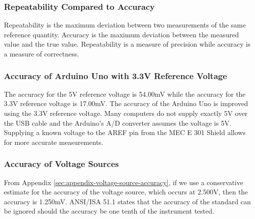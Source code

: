 \subsubsection{Repeatability Compared to Accuracy}
\noindent Repeatability is the maximum deviation between two measurements of the same reference quantity. Accuracy is the maximum deviation between the
measured value and the true value. Repeatability is a measure of precision while accuracy is a measure of correctness.

\subsubsection{Accuracy of Arduino Uno with 3.3V Reference Voltage}


\noindent The accuracy for the 5V reference voltage is 54.00mV while the accuracy for the 3.3V reference voltage is 17.00mV. The accuracy of the Arduino Uno is improved
using the 3.3V reference voltage. Many computers do not supply exactly 5V over the USB cable and the Arduino's A/D converter assumes the voltage is 5V. 
Supplying a known voltage to the AREF pin from the MEC E 301 Shield allows for more accurate measurements.

\subsubsection{Accuracy of Voltage Sources}
\noindent From Appendix \ref{sec:appendix-voltage-source-accuracy}, if we use a conservative estimate for the accuracy of the voltage source, which occurs at 2.500V, then the accuracy is 1.250mV. ANSI/ISA 51.1 states that the accuracy of the standard
can be ignored should the accuracy be one tenth of the instrument tested. %


